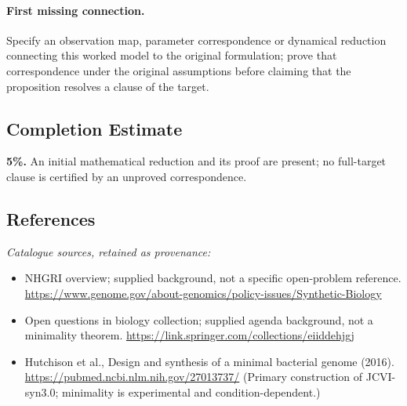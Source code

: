 \documentclass[11pt]{article}
\begin{document}
\paragraph{First missing connection.} Specify an observation map, parameter correspondence or dynamical reduction connecting this worked model to the original formulation; prove that correspondence under the original assumptions before claiming that the proposition resolves a clause of the target.
\subsection{Completion Estimate}
\textbf{5\%.} An initial mathematical reduction and its proof are present; no full-target clause is certified by an unproved correspondence.
\subsection{References}
\noindent\emph{Catalogue sources, retained as provenance:}
\begin{itemize}
\item NHGRI overview; supplied background, not a specific open-problem reference. \url{https://www.genome.gov/about-genomics/policy-issues/Synthetic-Biology}
\item Open questions in biology collection; supplied agenda background, not a minimality theorem. \url{https://link.springer.com/collections/eiiddehjgj}
\item Hutchison et al., Design and synthesis of a minimal bacterial genome (2016). \url{https://pubmed.ncbi.nlm.nih.gov/27013737/} (Primary construction of JCVI-syn3.0; minimality is experimental and condition-dependent.)
\end{itemize}
\end{document}
